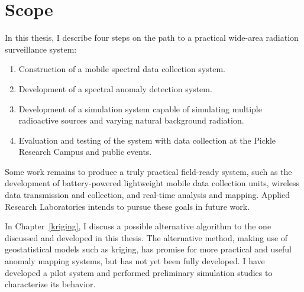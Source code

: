 \section{Scope}

In this thesis, I describe four steps on the path to a practical wide-area
radiation surveillance system:

\begin{enumerate}
  \item Construction of a mobile spectral data collection system.
  \item Development of a spectral anomaly detection system.
  \item Development of a simulation system capable of simulating multiple
    radioactive sources and varying natural background radiation.
  \item Evaluation and testing of the system with data collection at the Pickle
    Research Campus and public events.
\end{enumerate}

Some work remains to produce a truly practical field-ready system, such as the
development of battery-powered lightweight mobile data collection units,
wireless data transmission and collection, and real-time analysis and
mapping. Applied Research Laboratories intends to pursue these goals in future
work. 

In Chapter~\ref{kriging}, I discuss a possible alternative algorithm to the one
discussed and developed in this thesis. The alternative method, making use of
geostatistical models such as kriging, has promise for more practical and useful
anomaly mapping systems, but has not yet been fully developed. I have developed
a pilot system and performed preliminary simulation studies to characterize its
behavior.
